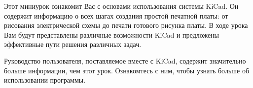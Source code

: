 
Этот миниурок ознакомит Вас с основами использования системы KiCad. Он содержит информацию 
о всех шагах создания простой печатной платы: от рисования электрической схемы до 
печати готового рисунка платы. В ходе урока Вам будут представлены различные 
возможности KiCad и предложены эффективные пути решения различных задач.

Руководство пользователя, поставляемое вместе с KiCad, содержит значительно больше 
информации, чем этот урок. Ознакомтесь с ним, чтобы узнать больше об 
использовании программы.



